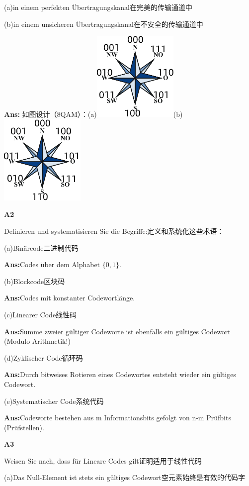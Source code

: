 \documentclass[fleqn]{article}
\begin{document}
(a)in einem perfekten Übertragungskanal在完美的传输通道中

(b)in einem unsicheren Übertragungskanal在不安全的传输通道中

\textbf{Ans:} 如图设计（8QAM）：(a)\includegraphics[scale=0.5]{bild12.png}(b)\includegraphics[scale=0.5]{bild11.png}

\noindent\textbf{A2}

Definieren und systematisieren Sie die Begriffe:定义和系统化这些术语：

(a)Binärcode二进制代码

\textbf{Ans:}Codes über dem Alphabet $\{0, 1\}$.

(b)Blockcode区块码

\textbf{Ans:}Codes mit konstanter Codewortlänge.

(c)Linearer Code线性码

\textbf{Ans:}Summe zweier gültiger Codeworte ist ebenfalls ein gültiges Codewort (Modulo-Arithmetik!)

(d)Zyklischer Code循环码

\textbf{Ans:}Durch bitweises Rotieren eines Codewortes entsteht wieder ein gültiges Codewort.

(e)Systematischer Code系统代码

\textbf{Ans:}Codeworte bestehen aus m Informationsbits gefolgt von n-m Prüfbits (Prüfstellen).

\noindent\textbf{A3}

Weisen Sie nach, dass für Lineare Codes gilt证明适用于线性代码

(a)Das Null-Element ist stets ein gültiges Codewort空元素始终是有效的代码字
\end{document}
